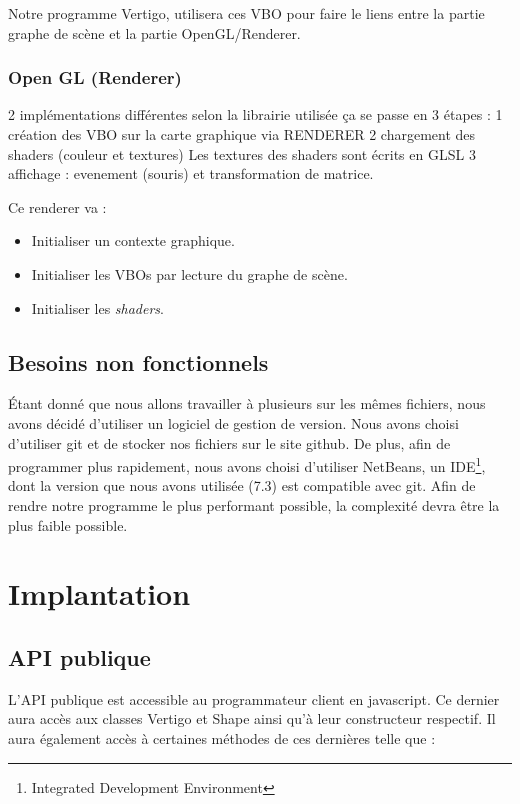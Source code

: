 \documentclass[11pt]{report}
\begin{document}
 Notre programme Vertigo, utilisera ces VBO pour faire le liens entre la partie graphe de scène et la partie OpenGL/Renderer.
 
 


\subsection{Open GL (Renderer)}
 2 implémentations différentes selon la librairie utilisée
 ça se passe en 3 étapes :
 1 création des VBO sur la carte graphique via RENDERER
2 chargement des shaders (couleur et textures)
 Les textures des shaders sont écrits en GLSL
3 affichage : evenement (souris) et transformation de matrice. 

Ce renderer va :
\begin{itemize}
\item Initialiser un contexte graphique. %
\item Initialiser les VBOs par lecture du graphe de scène.
\item Initialiser les \textit{shaders}. %
\end{itemize}



\section{Besoins non fonctionnels}
Étant donné que nous allons travailler à plusieurs sur les mêmes fichiers, nous avons décidé d'utiliser un logiciel de gestion de version. Nous avons choisi d'utiliser git\cite{git} et de stocker nos fichiers sur le site github\cite{github}.
De plus, afin de programmer plus rapidement, nous avons choisi d'utiliser NetBeans\cite{netbeans}, un IDE\footnote{Integrated Development Environment}, dont la version que nous avons utilisée (7.3) est compatible avec git.
Afin de rendre notre programme le plus performant possible, la complexité devra être la plus faible possible. 
\chapter{Implantation} %
\section{API publique} 
L'API publique est accessible au programmateur client en javascript.
Ce dernier aura accès aux classes Vertigo et Shape ainsi qu'à leur constructeur respectif.
Il aura également accès à certaines méthodes de ces dernières telle que : 
\\
\end{document}
